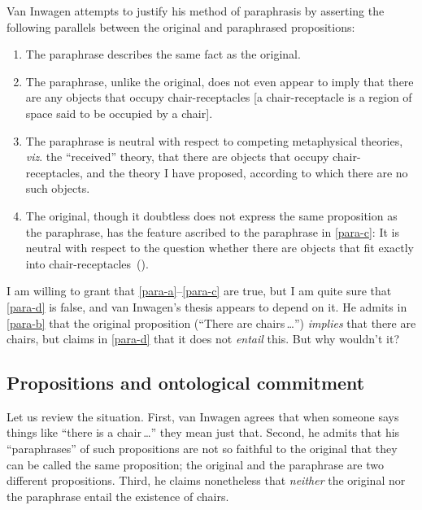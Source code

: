 \documentclass[11pt]{article}
\begin{document}
\begin{spacing}{1.5}
Van Inwagen attempts to justify his method of paraphrasis by asserting
the following parallels between the original and paraphrased
propositions:
\begin{enumerate}[ref=(\arabic*)]
	\item The paraphrase describes the same fact as the
          original.  \label{para-a}
	\item The paraphrase, unlike the original, does not even
          appear to imply that there are any objects that occupy
          chair-receptacles [a chair-receptacle is a region of space
            said to be occupied by a chair].  \label{para-b}
	\item The paraphrase is neutral with respect to competing
          metaphysical theories, {\em viz}.  the ``received'' theory,
          that there are objects that occupy chair-receptacles, and
          the theory I have proposed, according to which there are no
          such objects.  \label{para-c}
	\item The original, though it doubtless does not express the
          same proposition as the paraphrase, has the feature ascribed
          to the paraphrase in \ref{para-c}: It is neutral with
          respect to the question whether there are objects that fit
          exactly into
          chair-receptacles~(\citeyear[113]{inwagen1995}).  \label{para-d}
\end{enumerate}
I am willing to grant that \ref{para-a}--\ref{para-c} are true, but I
am quite sure that \ref{para-d} is false, and van Inwagen's thesis
appears to depend on it.  He admits in \ref{para-b} that the original
proposition (``There are chairs\,\ldots '') {\em implies} that there
are chairs, but claims in \ref{para-d} that it does not {\em entail}
this.  But why wouldn't it?

\subsection{Propositions and ontological commitment}
\label{prop-ont}
Let us review the situation.  First, van Inwagen agrees that when
someone says things like ``there is a chair\,\ldots '' they mean just
that.  Second, he admits that his ``paraphrases'' of such propositions
are not so faithful to the original that they can be called the same
proposition; the original and the paraphrase are two different
propositions.  Third, he claims nonetheless that {\em neither} the
original nor the paraphrase entail the existence of chairs.


\end{spacing}
\end{document}
